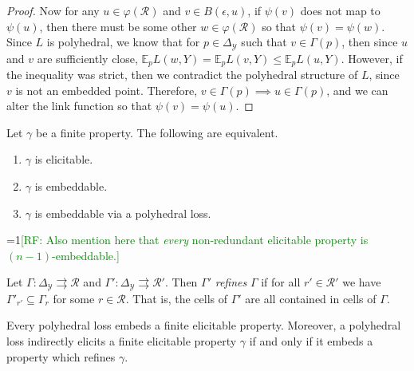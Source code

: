 \documentclass[11pt]{colt2019}
\newcommand{\Comments}{1}
\newcommand{\mynote}[2]{\ifnum\Comments=1\textcolor{#1}{#2}\fi}
\newcommand{\raf}[1]{\mynote{green}{[RF: #1]}}
\newcommand{\simplex}{\Delta_\Y}
\newcommand{\E}{\mathbb{E}}
\newcommand{\R}{\mathcal{R}}
\newcommand{\Y}{\mathcal{Y}}
\newcommand{\toto}{\rightrightarrows}
\newcommand{\conv}{\mathrm{conv}}
\DeclareMathOperator*{\arginf}{arg\,inf}
\begin{document}
\begin{proof}
  Now for any $u \in \varphi(\R)$ and $v \in B(\epsilon, u)$, if $\psi(v)$ does not map to $\psi(u)$, then there must be some other $w \in \varphi(\R)$ so that $\psi(v) = \psi(w)$.
  Since $L$ is polyhedral, we know that for $p \in \simplex$ such that $v \in \Gamma(p)$, then since $u$ and $v$ are sufficiently close, $\E_p L(w,Y) = \E_p L(v,Y) \leq \E_p L(u,Y)$.
  However, if the inequality was strict, then we contradict the polyhedral structure of $L$, since $v$ is not an embedded point.
  Therefore, $v \in \Gamma(p) \implies u \in \Gamma(p)$, and we can alter the link function so that $\psi(v) = \psi(u)$.
\end{proof}

\begin{theorem}
  Let $\gamma$ be a finite property.
  The following are equivalent.
  \begin{enumerate}
  \item $\gamma$ is elicitable.
  \item $\gamma$ is embeddable.
  \item $\gamma$ is embeddable via a polyhedral loss.
  \end{enumerate}
\end{theorem}
\raf{Also mention here that \emph{every} non-redundant elicitable property is $(n-1)$-embeddable.}

\begin{definition}
  Let $\Gamma:\simplex\toto\R$ and $\Gamma':\simplex\toto\R'$.
  Then $\Gamma'$ \emph{refines} $\Gamma$ if for all $r'\in\R'$ we have $\Gamma'_{r'} \subseteq \Gamma_r$ for some $r\in\R$.
  That is, the cells of $\Gamma'$ are all contained in cells of $\Gamma$.
\end{definition}

\begin{theorem}\label{thm:polyhedral-embed}
  Every polyhedral loss embeds a finite elicitable property.
  Moreover, a polyhedral loss indirectly elicits a finite elicitable property $\gamma$ if and only if it embeds a property which refines $\gamma$.
\end{theorem}
\end{document}
